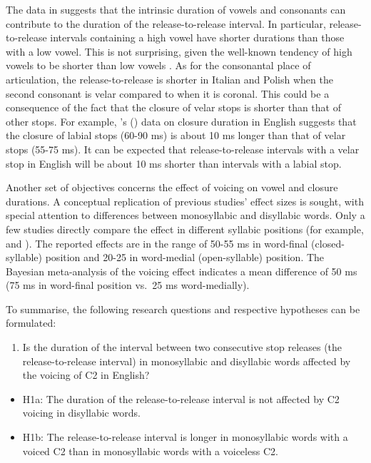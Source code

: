 \documentclass[
  12pt,
  a4paper,
]{article}
\providecommand{\tightlist}{%
  \setlength{\itemsep}{0pt}\setlength{\parskip}{0pt}}
\begin{document}
The data in \citet{coretta2018j} suggests that the intrinsic duration of
vowels and consonants can contribute to the duration of the
release-to-release interval. In particular, release-to-release intervals
containing a high vowel have shorter durations than those with a low
vowel. This is not surprising, given the well-known tendency of high
vowels to be shorter than low vowels
\citep{hertrich1997, esposito2002, mortensen2013, toivonen2015, kawahara2017}.
As for the consonantal place of articulation, the release-to-release is
shorter in Italian and Polish when the second consonant is velar
compared to when it is coronal. This could be a consequence of the fact
that the closure of velar stops is shorter than that of other stops. For
example, \citeauthor{sharf1962}'s (\citeyear{sharf1962}) data on closure
duration in English suggests that the closure of labial stops (60-90 ms)
is about 10 ms longer than that of velar stops (55-75 ms). It can be
expected that release-to-release intervals with a velar stop in English
will be about 10 ms shorter than intervals with a labial stop.

Another set of objectives concerns the effect of voicing on vowel and
closure durations. A conceptual replication of previous studies' effect
sizes is sought, with special attention to differences between
monosyllabic and disyllabic words. Only a few studies directly compare
the effect in different syllabic positions (for example,
\citet{sharf1962} and \citet{klatt1973}). The reported effects are in
the range of 50-55 ms in word-final (closed-syllable) position and 20-25
in word-medial (open-syllable) position. The Bayesian meta-analysis of
the voicing effect indicates a mean difference of 50 ms (75 ms in
word-final position vs.~25 ms word-medially).

To summarise, the following research questions and respective hypotheses
can be formulated:

\begin{enumerate}
\def\labelenumi{\arabic{enumi}.}
\tightlist
\item
  Is the duration of the interval between two consecutive stop releases
  (the release-to-release interval) in monosyllabic and disyllabic words
  affected by the voicing of C2 in English?
\end{enumerate}

\begin{itemize}
\tightlist
\item
  H1a: The duration of the release-to-release interval is not affected
  by C2 voicing in disyllabic words.
\item
  H1b: The release-to-release interval is longer in monosyllabic words
  with a voiced C2 than in monosyllabic words with a voiceless C2.
\end{itemize}
\end{document}
